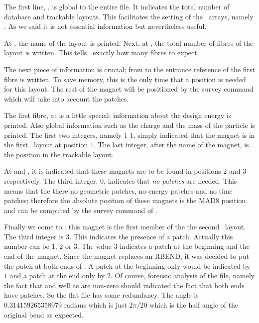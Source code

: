{{The first line, ,  is  global to the entire file. It indicates the total number of database and trackable layouts. This facilitates the setting of the \DNA\ arrays, namely . As we said it is not essential information but nevertheless useful.

At , the name of the layout is printed. Next, at  , the total number of fibres of the layout is written. This tells \PTC\ exactly how many fibres to expect.

The next piece of information is crucial; from  to  the entrance reference of the first fibre is written. To save memory, this is the only time that a position is needed for this layout. The rest of the magnet will be positioned by the survey command which will take into account the patches. 


The first fibre, at   is a little special:  information about the design energy is printed. Also global information such as the charge and the mass of the particle is printed. The first two integers, namely $1 \, \, 1$, simply indicated that the magnet is in the  first \DNA\ layout at position $1$. The last integer, after the name of the magnet, is the position in the trackable layout.

At     and , it is indicated that these magnets are to be found in positions $2$ and $3$ respectively. The third  integer, $0$, indicates that \emph{no patches} are needed. This means that the there no geometric patches, no energy patches and no time patches; therefore the absolute position of these magnets is the MAD8 position and  can be computed by the survey command of \PTC .

Finally we come to : this magnet is the first member of the the second \DNA\ layout. The third integer is $3$. This  indicates the presence of a patch. Actually this number can be $1$, $2$ or $3$. The value $3$ indicates a patch at the beginning and the end of the magnet. Since the magnet  replaces an RBEND, it was decided to put the patch at both ends of . A patch at the beginning only would be indicated by $1$ and a patch at the end only by $2$. Of course, forensic analysis of the file, namely the fact that  and well as  are non-zero should indicated the fact that both ends have patches. So the flat file has some redundancy. The angle is $0.314159265358979$ radians which is just $2 \pi / 20 $ which is the half angle of the original bend as expected.

}}
